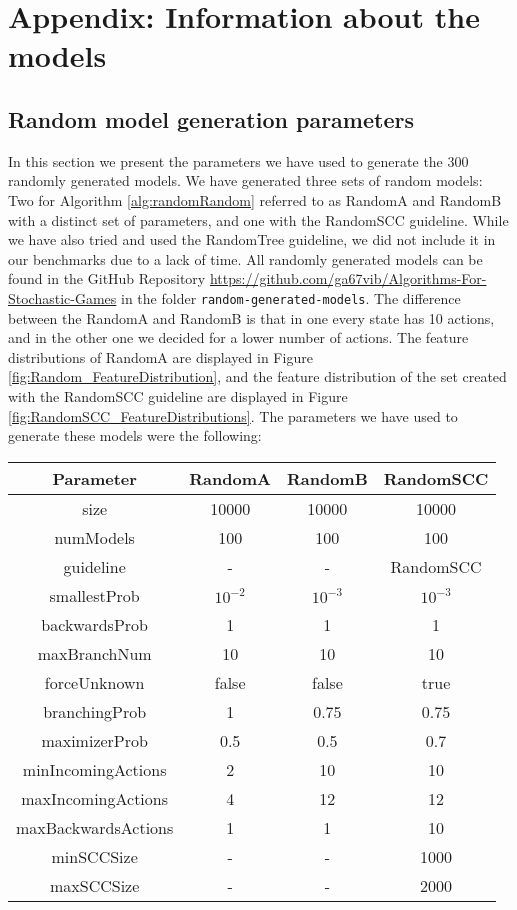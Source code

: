 \chapter{Appendix: Information about the models} \label{sec:appendix}

\section*{Random model generation parameters} \label{sec:GenParams}
In this section we present the parameters we have used to generate the 300 randomly generated models. 
We have generated three sets of random models: Two for Algorithm \ref{alg:randomRandom} referred to as RandomA and RandomB with a distinct set of parameters, and one with the RandomSCC guideline.
While we have also tried and used the RandomTree guideline, we did not include it in our benchmarks due to a lack of time.
All randomly generated models can be found in the GitHub Repository \url{https://github.com/ga67vib/Algorithms-For-Stochastic-Games} in the folder \texttt{random-generated-models}.
The difference between the RandomA and RandomB is that in one every state has 10 actions,
and in the other one we decided for a lower number of actions. The feature distributions of RandomA are displayed in Figure \ref{fig:Random_FeatureDistribution}, 
and the feature distribution of the set created with the RandomSCC guideline are displayed in Figure \ref{fig:RandomSCC_FeatureDistributions}.
The parameters we have used to generate these models were the following:
\begin{center}
	\begin{tabular}{| c | c c c |} 
	 \hline
	 Parameter & RandomA & RandomB & RandomSCC \\ [0.5ex] 
	 \hline\hline
	 size & 10000 & 10000 & 10000 \\
	 \hline
	 numModels & 100 & 100 & 100 \\
	 \hline
	 guideline & - & - & RandomSCC \\
	 \hline
	 smallestProb & $10^{-2}$ & $10^{-3}$ & $10^{-3}$ \\
	 \hline
	 backwardsProb & 1 & 1 & 1 \\ [1ex] 
	 \hline
	 maxBranchNum & 10 & 10 & 10 \\ [1ex] 
	 \hline
	 forceUnknown & false & false & true \\ [1ex] 
	 \hline
	 branchingProb & 1 & 0.75 & 0.75 \\ [1ex] 
	 \hline
	 maximizerProb & 0.5 & 0.5 & 0.7 \\ [1ex] 
	 \hline
	 minIncomingActions & 2 & 10 & 10 \\ [1ex] 
	 \hline
	 maxIncomingActions & 4 & 12 & 12 \\ [1ex] 
	 \hline
	 maxBackwardsActions & 1 & 1 & 10 \\ [1ex] 
	 \hline
	 minSCCSize & - & - & 1000 \\ [1ex] 
	 \hline
	 maxSCCSize & - & - & 2000 \\ [1ex] 
	 \hline
	\end{tabular}
\end{center}
	

